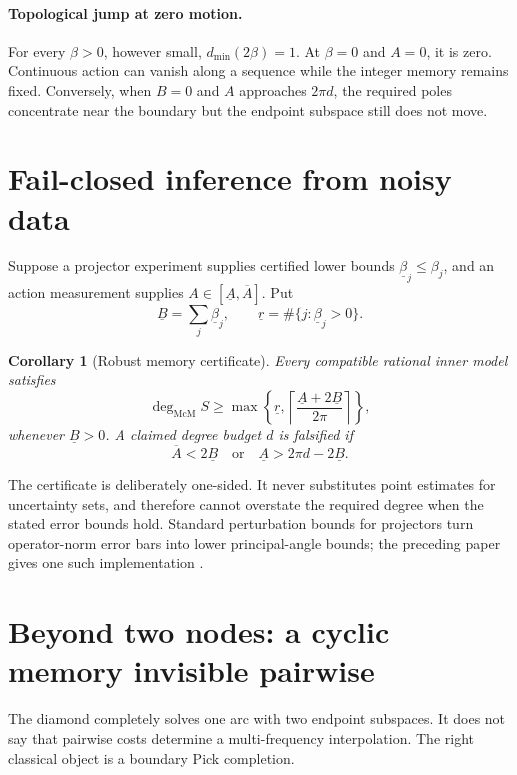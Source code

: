\documentclass[11pt]{article}
\newtheorem{corollary}[theorem]{Corollary}
\theoremstyle{definition}
\theoremstyle{remark}
\newcommand{\mcdeg}{\deg_{\mathrm{McM}}}
\begin{document}
\paragraph{Topological jump at zero motion.}
For every $\beta>0$, however small, $d_{\min}(2\beta)=1$.  At $\beta=0$ and
$A=0$, it is zero.  Continuous action can vanish along a sequence while the
integer memory remains fixed.  Conversely, when $B=0$ and $A$ approaches
$2\pi d$, the required poles concentrate near the boundary but the endpoint
subspace still does not move.

\section{Fail-closed inference from noisy data}

Suppose a projector experiment supplies certified lower bounds
$\underline\beta_j\le\beta_j$, and an action measurement supplies
$A\in[\underline A,\overline A]$.  Put
\[
 \underline B=\sum_j\underline\beta_j,
 \qquad
 \underline r=\#\{j:\underline\beta_j>0\}.
\]

\begin{corollary}[Robust memory certificate]\label{cor:robust}
Every compatible rational inner model satisfies
\begin{equation}\label{eq:robustdegree}
 \mcdeg S\ge
 \max\left\{\underline r,
 \left\lceil\frac{\underline A+2\underline B}{2\pi}\right\rceil
 \right\},
\end{equation}
whenever $\underline B>0$.  A claimed degree budget $d$ is falsified if
\[
 \overline A<2\underline B
 \quad\text{or}\quad
 \underline A>2\pi d-2\underline B.
\]
\end{corollary}

The certificate is deliberately one-sided.  It never substitutes point
estimates for uncertainty sets, and therefore cannot overstate the required
degree when the stated error bounds hold.  Standard perturbation bounds for
projectors turn operator-norm error bars into lower principal-angle bounds;
the preceding paper gives one such implementation
\cite{ErikssonDelayRegions2026}.

\section{Beyond two nodes: a cyclic memory invisible pairwise}

The diamond completely solves one arc with two endpoint subspaces.  It does
not say that pairwise costs determine a multi-frequency interpolation.  The
right classical object is a boundary Pick completion.
\end{document}

